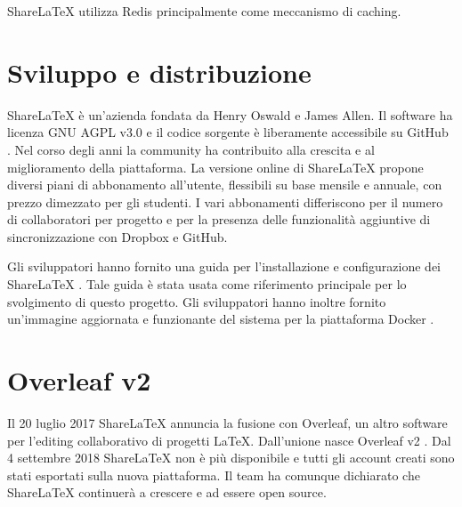 ShareLaTeX utilizza Redis principalmente come meccanismo di caching.


\section{Sviluppo e distribuzione}
ShareLaTeX è un'azienda fondata da Henry Oswald e James Allen. Il software ha licenza GNU AGPL v3.0 e il codice sorgente è liberamente accessibile su GitHub \cite{sharelatex_gh}. Nel corso degli anni la community ha contribuito alla crescita e al miglioramento della piattaforma. La versione online di ShareLaTeX propone diversi piani di abbonamento all'utente, flessibili su base mensile e annuale, con prezzo dimezzato per gli studenti. I vari abbonamenti differiscono per il numero di collaboratori per progetto e per la presenza delle funzionalità aggiuntive di sincronizzazione con Dropbox e GitHub.

Gli sviluppatori hanno fornito una guida per l'installazione e configurazione dei ShareLaTeX \cite{sharelatex_wiki}. Tale guida è stata usata come riferimento principale per lo svolgimento di questo progetto. Gli sviluppatori hanno inoltre fornito un'immagine aggiornata e funzionante del sistema per la piattaforma Docker \cite{sharelatex_docker_hub}.

\section{Overleaf v2}
Il 20 luglio 2017 ShareLaTeX annuncia la fusione con Overleaf, un altro software per l'editing collaborativo di progetti \LaTeX. Dall'unione nasce Overleaf v2 \cite{overleaf_v2}. Dal 4 settembre 2018 ShareLaTeX non è più disponibile e tutti gli account creati sono stati esportati sulla nuova piattaforma. Il team ha comunque dichiarato che ShareLaTeX continuerà a crescere e ad essere open source.

